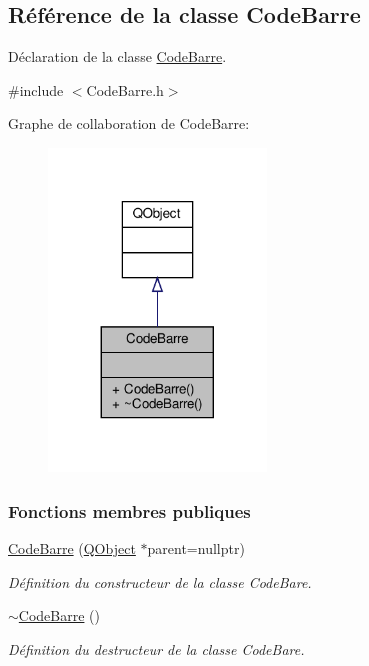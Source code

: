 \hypertarget{class_code_barre}{}\subsection{Référence de la classe Code\+Barre}
\label{class_code_barre}


Déclaration de la classe \hyperlink{class_code_barre}{Code\+Barre}.  




{\ttfamily \#include $<$Code\+Barre.\+h$>$}



Graphe de collaboration de Code\+Barre\+:
\nopagebreak
\begin{figure}[H]
\begin{center}
\leavevmode
\includegraphics[width=164pt]{class_code_barre__coll__graph}
\end{center}
\end{figure}
\subsubsection*{Fonctions membres publiques}
\begin{DoxyCompactItemize}
\item 
\hyperlink{class_code_barre_a8134bef083f6fa0e01c848d5edd83754}{Code\+Barre} (\hyperlink{class_q_object}{Q\+Object} $\ast$parent=nullptr)
\begin{DoxyCompactList}\small\item\em Définition du constructeur de la classe Code\+Bare. \end{DoxyCompactList}\item 
\hyperlink{class_code_barre_a5bb3df2e5c7fba829f0274da4c359f6c}{$\sim$\+Code\+Barre} ()
\begin{DoxyCompactList}\small\item\em Définition du destructeur de la classe Code\+Bare. \end{DoxyCompactList}\end{DoxyCompactItemize}



